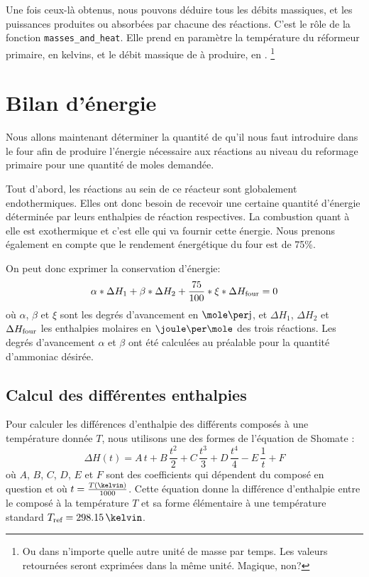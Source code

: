 Une fois ceux-là obtenus, nous pouvons déduire tous
les débits massiques,
et les puissances produites ou absorbées par chacune des réactions.
C'est le rôle de la fonction \texttt{masses\_and\_heat}.
Elle prend en paramètre la température du réformeur primaire, en kelvins,
et le débit massique de  à produire, en \kilogram\per\second.%
\footnote{Ou dans n'importe quelle autre unité de masse par temps.
Les valeurs retournées seront exprimées dans la même unité. Magique, non?}

\section{Bilan d'énergie}

Nous allons maintenant déterminer la quantité de  qu’il nous faut introduire
dans le four afin de produire l’énergie nécessaire aux réactions
au niveau du reformage primaire pour une quantité de moles demandée.

Tout d’abord, les réactions au sein de ce réacteur sont globalement endothermiques.
Elles ont donc besoin de recevoir une certaine quantité d’énergie
déterminée par leurs enthalpies de réaction respectives.
La combustion quant à elle est exothermique et c’est elle qui va fournir cette énergie.
Nous prenons également en compte que le rendement énergétique du four est de 75\%.

On peut donc exprimer la conservation d'énergie:
$$\alpha*\Delta H_1 + \beta*\Delta H_2 + \frac{75}{100}*\xi*\Delta H_{\mbox{\scriptsize{four}}} = 0$$
où $\alpha$, $\beta$ et $\xi$ sont les degrés d'avancement en $\mole\per\jour$,
et $\Delta H_1$, $\Delta H_2$ et $\Delta H_{\mbox{\scriptsize{four}}}$ les enthalpies molaires en
$\joule\per\mole$ des trois réactions.
Les degrés d'avancement $\alpha$ et $\beta$ ont été calculées
au préalable pour la quantité d’ammoniac désirée.

\subsection{Calcul des différentes enthalpies}

Pour calculer les différences d'enthalpie des différents composés
à une température donnée $T$,
nous utilisons une des formes de l'équation de Shomate \cite{nist}:
$$\Delta H(t) = A\,t + B\,\frac{t^2}{2} + C\,\frac{t^3}{3}
+ D\,\frac{t^4}{4} - E\,\frac{1}{t} + F$$
où $A$, $B$, $C$, $D$, $E$ et $F$ sont des coefficients
qui dépendent du composé en question et où $t=\frac{T(\kelvin)}{1000}$.
Cette équation donne la différence d'enthalpie entre le composé à la température $T$
et sa forme élémentaire à une température standard $T\ind{ref} = 298.15\,\kelvin$.

